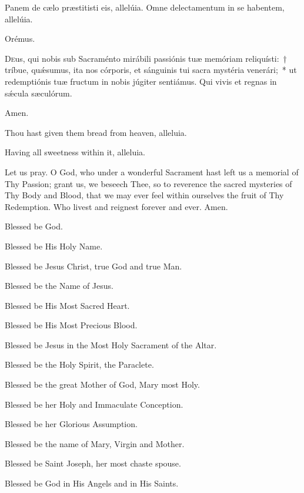 \documentclass[11pt]{article}
\begin{document}
   \begin{paracol}{2}
   
\noindent \vv Panem de cælo præstitisti eis, allelúia.
\noindent \rr Omne delectamentum in se habentem, allelúia.
  
  Orémus.
  
  \lettrine{D}{e}us, qui nobis sub Sacraménto mirábili passiónis tuæ memóriam reliquísti:~† tríbue, quǽsumus, ita nos córporis, et sánguinis tui sacra mystéria venerári;~* ut redemptiónis tuæ fructum in nobis júgiter sentiámus. Qui vivis et regnas in sǽcula sæculórum. 
  
  \rr Amen.
  \switchcolumn
\begin{otherlanguage}{english}
\noindent \vv Thou hast given them bread from heaven, alleluia.

\noindent \rr Having all sweetness within it, alleluia.

\noindent Let us pray. O God, who under a wonderful Sacrament hast left us a memorial of Thy Passion; grant us, we beseech Thee, so to reverence the sacred mysteries of Thy Body and Blood, that we may ever feel within ourselves the fruit of Thy Redemption. Who livest and reignest forever and ever. Amen.

\end{otherlanguage}
\end{paracol}

\begin{multicols}{2}
\raggedcolumns
\begin{otherlanguage}{english}

Blessed be God. 

Blessed be His Holy Name. 

Blessed be Jesus Christ, true God and true Man.
 
Blessed be the Name of Jesus.

Blessed be His Most Sacred Heart.

Blessed be His Most Precious Blood.

Blessed be Jesus in the Most Holy Sacrament of the Altar.

Blessed be the Holy Spirit, the Paraclete.

Blessed be the great Mother of God, Mary most Holy.

Blessed be her Holy and Immaculate Conception.


Blessed be her Glorious Assumption.

Blessed be the name of Mary, Virgin and Mother.

Blessed be Saint Joseph, her most chaste spouse.

Blessed be God in His Angels and in His Saints.

\end{otherlanguage}
\end{multicols}
\end{document}
